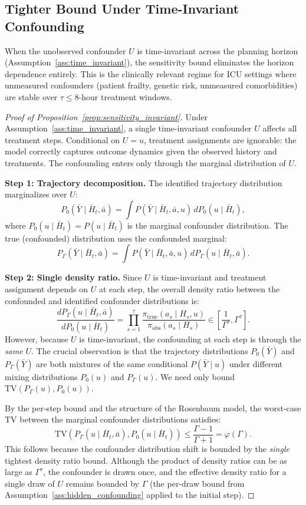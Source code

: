 \documentclass{article}
\newcommand{\TV}{\mathrm{TV}}
\newcommand{\bH}{\bar{H}}
\newcommand{\ba}{\bar{a}}
\newcommand{\bY}{\bar{Y}}
\begin{document}
\subsection{Tighter Bound Under Time-Invariant Confounding}
\label{app:sensitivity_invariant}

When the unobserved confounder $U$ is time-invariant across the planning horizon (Assumption~\ref{ass:time_invariant}), the sensitivity bound eliminates the horizon dependence entirely. This is the clinically relevant regime for ICU settings where unmeasured confounders (patient frailty, genetic risk, unmeasured comorbidities) are stable over $\tau \leq 8$-hour treatment windows.

\begin{proof}[Proof of Proposition~\ref{prop:sensitivity_invariant}]
Under Assumption~\ref{ass:time_invariant}, a single time-invariant confounder $U$ affects all treatment steps. Conditional on $U = u$, treatment assignments are ignorable: the model correctly captures outcome dynamics given the observed history and treatments. The confounding enters only through the marginal distribution of $U$.

\textbf{Step 1: Trajectory decomposition.} The identified trajectory distribution marginalizes over $U$:
\[
P_0(\bY \mid \bH_t, \ba) = \int P(\bY \mid \bH_t, \ba, u)\, dP_0(u \mid \bH_t),
\]
where $P_0(u \mid \bH_t) = P(u \mid \bH_t)$ is the marginal confounder distribution. The true (confounded) distribution uses the confounded marginal:
\[
P_\Gamma(\bY \mid \bH_t, \ba) = \int P(\bY \mid \bH_t, \ba, u)\, dP_\Gamma(u \mid \bH_t, \ba).
\]

\textbf{Step 2: Single density ratio.} Since $U$ is time-invariant and treatment assignment depends on $U$ at each step, the overall density ratio between the confounded and identified confounder distributions is:
\[
\frac{dP_\Gamma(u \mid \bH_t, \ba)}{dP_0(u \mid \bH_t)} = \prod_{s=1}^{\tau} \frac{\pi_{\mathrm{true}}(a_s \mid H_s, u)}{\pi_{\mathrm{obs}}(a_s \mid H_s)} \in \left[\frac{1}{\Gamma^\tau}, \Gamma^\tau\right].
\]
However, because $U$ is time-invariant, the confounding at each step is through the \emph{same} $U$. The crucial observation is that the trajectory distributions $P_0(\bY)$ and $P_\Gamma(\bY)$ are both mixtures of the same conditional $P(\bY \mid u)$ under different mixing distributions $P_0(u)$ and $P_\Gamma(u)$. We need only bound $\TV(P_\Gamma(u), P_0(u))$.

By the per-step bound and the structure of the Rosenbaum model, the worst-case TV between the marginal confounder distributions satisfies:
\[
\TV(P_\Gamma(u \mid \bH_t, \ba), P_0(u \mid \bH_t)) \leq \frac{\Gamma - 1}{\Gamma + 1} = \varphi(\Gamma).
\]
This follows because the confounder distribution shift is bounded by the \emph{single} tightest density ratio bound. Although the product of density ratios can be as large as $\Gamma^\tau$, the confounder is drawn once, and the effective density ratio for a single draw of $U$ remains bounded by $\Gamma$ (the per-draw bound from Assumption~\ref{ass:hidden_confounding} applied to the initial step).


\end{proof}
\end{document}
